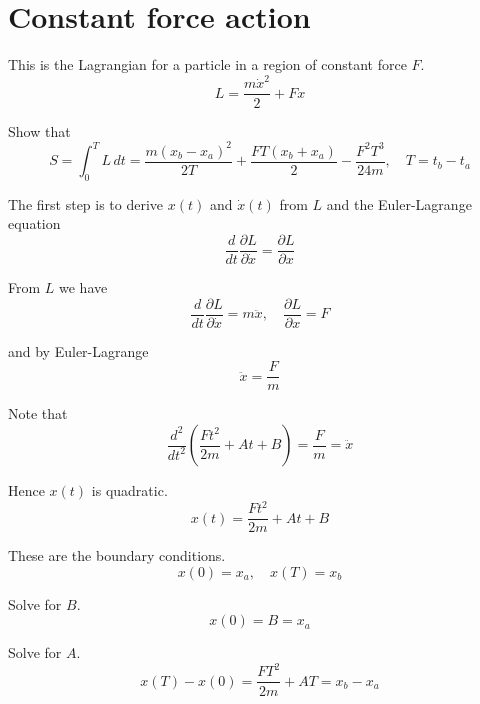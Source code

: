 


\section*{Constant force action}

This is the Lagrangian for a particle in a region of constant force $F$.
\begin{equation*}
L=\frac{m\dot x^2}{2}+Fx
\end{equation*}

Show that
\begin{equation*}
S=\int_0^TL\,dt=\frac{m(x_b-x_a)^2}{2T}+\frac{FT(x_b+x_a)}{2}-\frac{F^2T^3}{24m},\quad T=t_b-t_a
\end{equation*}

The first step is to derive $x(t)$ and $\dot x(t)$ from $L$ and the Euler-Lagrange equation
\begin{equation*}
\frac{d}{dt}\frac{\partial L}{\partial\dot x}=\frac{\partial L}{\partial x}
\end{equation*}

From $L$ we have
\begin{equation*}
\frac{d}{dt}\frac{\partial L}{\partial\dot x}=m\ddot x,\quad
\frac{\partial L}{\partial x}=F
\end{equation*}

and by Euler-Lagrange
\begin{equation*}
\ddot x=\frac{F}{m}
\end{equation*}

Note that
\begin{equation*}
\frac{d^2}{dt^2}\left(\frac{Ft^2}{2m}+At+B\right)=\frac{F}{m}=\ddot x
\end{equation*}

Hence $x(t)$ is quadratic.
\begin{equation*}
x(t)=\frac{Ft^2}{2m}+At+B
\end{equation*}

These are the boundary conditions.
\begin{equation*}
x(0)=x_a,\quad x(T)=x_b
\end{equation*}

Solve for $B$.
\begin{equation*}
x(0)=B=x_a
\end{equation*}

Solve for $A$.
\begin{equation*}
x(T)-x(0)=\frac{FT^2}{2m}+AT=x_b-x_a
\end{equation*}

